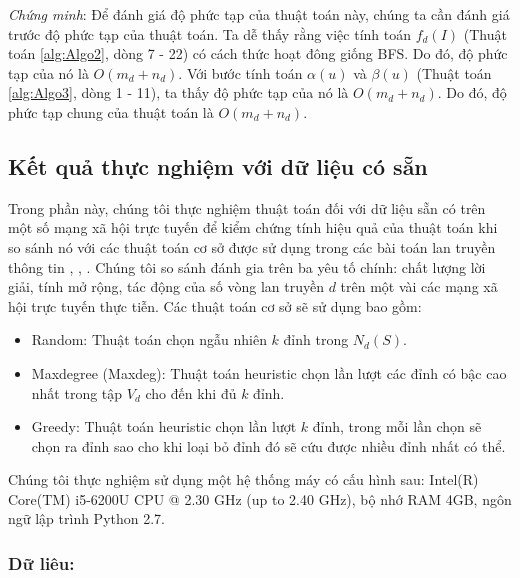  	{\itshape Chứng minh}: Để đánh giá độ phức tạp của thuật toán này, chúng ta cần đánh giá trước độ phức tạp của thuật toán. Ta dễ thấy rằng việc tính  toán $f_{d}(I)$ (Thuật toán \ref{alg:Algo2}, dòng 7 - 22) có cách thức hoạt đông giống BFS. Do đó, độ phức tạp của nó là $O(m_{d} + n_{d})$. Với bước tính toán $\alpha(u)$ và $\beta(u)$ (Thuật toán \ref{alg:Algo3}, dòng 1 - 11), ta thấy độ phức tạp của nó là $O(m_{d} + n_{d})$. Do đó, độ phức tạp chung của thuật toán là $O(m_{d} + n_{d})$. 
		
\subsection{Kết quả thực nghiệm với dữ liệu có sẵn}

Trong phần này, chúng tôi thực nghiệm thuật toán đối với dữ liệu sẵn có trên một số mạng xã hội trực tuyến để kiểm chứng tính hiệu quả của thuật toán khi so sánh nó với các thuật toán cơ sở được sử dụng trong các bài toán lan truyền thông tin \cite{nguyen30}, \cite{kemple1}, \cite{zhang32}. Chúng tôi so sánh đánh gia trên ba yêu tố chính: chất lượng lời giải, tính mở rộng, tác động của số vòng lan truyền $d$ trên một vài các mạng xã hội trực tuyến thực tiễn. Các thuật toán cơ sở sẽ sử dụng bao gồm:
\begin{itemize}
	\item Random: Thuật toán chọn ngẫu nhiên $k$ đỉnh trong $N_{d}(S)$.
	
	\item Maxdegree (Maxdeg): Thuật toán heuristic chọn lần lượt các đỉnh có bậc cao nhất trong tập $V_{d}$ cho đến khi đủ $k$ đỉnh.
	
	\item Greedy: Thuật toán heuristic chọn lần lượt $k$ đỉnh, trong mỗi lần chọn sẽ chọn ra đỉnh sao cho khi loại bỏ đỉnh đó sẽ cứu được nhiều đỉnh nhất có thể.
\end{itemize}

Chúng tôi thực nghiệm sử dụng một hệ thống máy có cấu hình sau: Intel(R) Core(TM) i5-6200U CPU @ 2.30 GHz (up to 2.40 GHz), bộ nhớ RAM 4GB, ngôn ngữ lập trình Python 2.7.

\subsubsection{Dữ liêu:}

